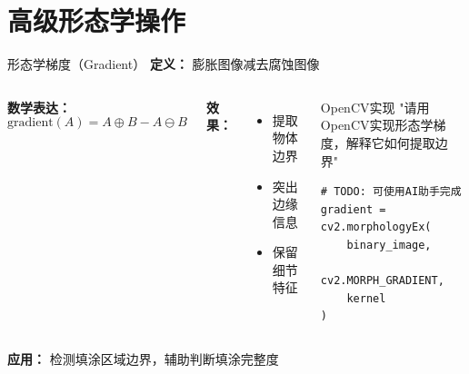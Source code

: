 \section{高级形态学操作}

\begin{frame}{形态学梯度（Gradient）}
    \textbf{定义：} 膨胀图像减去腐蚀图像

    \vspace{0.3cm}

    \begin{columns}
        \textbf{数学表达：}
        \[ \text{gradient}(A) = A \oplus B - A \ominus B \]

        \textbf{效果：}
        \begin{itemize}
            \item 提取物体边界
            \item 突出边缘信息
            \item 保留细节特征
        \end{itemize}

        \begin{block}{OpenCV实现}
        \aihint{} "请用OpenCV实现形态学梯度，解释它如何提取边界"
        \begin{lstlisting}
# TODO: 可使用AI助手完成
gradient = cv2.morphologyEx(
    binary_image,
    cv2.MORPH_GRADIENT,
    kernel
)
        \end{lstlisting}
        \end{block}
    \end{columns}

    \vspace{0.3cm}

    \textbf{应用：} 检测填涂区域边界，辅助判断填涂完整度
\end{frame}

